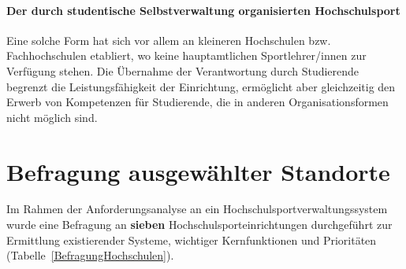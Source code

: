 \paragraph*{Der durch studentische Selbstverwaltung organisierten Hochschulsport}
Eine solche Form hat sich vor allem an kleineren Hochschulen bzw. Fachhochschulen etabliert, wo keine hauptamtlichen Sportlehrer/innen zur Verfügung stehen. Die Übernahme der Verantwortung durch Studierende begrenzt die Leistungsfähigkeit der Einrichtung, ermöglicht aber gleichzeitig den Erwerb von Kompetenzen für Studierende, die in anderen Organisationsformen nicht möglich sind. 

\section{Befragung ausgewählter Standorte}
Im Rahmen der Anforderungsanalyse an ein Hochschulsportverwaltungssystem wurde eine Befragung an \textbf{sieben} Hochschulsporteinrichtungen durchgeführt zur Ermittlung existierender Systeme, wichtiger Kernfunktionen und Prioritäten (Tabelle~\ref{BefragungHochschulen}).

\begin{table}[h]
\centering
{}
\caption{Übersicht befragter Hochschulen}
\label{BefragungHochschulen}
\end{table}

